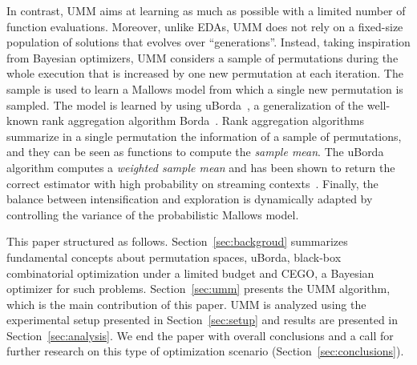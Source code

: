 \documentclass[runningheads]{llncs}
\begin{document}
In contrast, UMM aims at learning as much as possible with a limited number of
function evaluations. Moreover, unlike EDAs, UMM does not rely on a fixed-size
population of solutions that evolves over ``generations''. Instead, taking
inspiration from Bayesian optimizers, UMM considers a sample of permutations
during the whole execution that is increased by one new permutation at each
iteration. The sample is used to learn a Mallows model from which a single new
permutation is sampled. The model is learned by using
uBorda~\cite{IruLobPer2020arxiv}, a generalization of the well-known rank
aggregation algorithm Borda~\cite{AliMei2011kemeny}. Rank aggregation algorithms
summarize in a single permutation the information of a sample of permutations,
and they can be seen as functions to compute the \emph{sample mean}. The uBorda
algorithm computes a \textit{weighted sample mean} and has been shown to return
the correct estimator with high probability on streaming
contexts~\cite{IruLobPer2020arxiv}.
%
Finally, the balance between intensification and exploration is dynamically
adapted by controlling the variance of the probabilistic Mallows model.



This paper structured as follows. Section~\ref{sec:backgroud} summarizes fundamental concepts about permutation spaces, uBorda, black-box combinatorial optimization under a limited budget and CEGO, a Bayesian optimizer for such problems. Section~\ref{sec:umm} presents the UMM algorithm, which is the main contribution of this paper. UMM is analyzed using the experimental setup presented in Section~\ref{sec:setup} and results are presented in Section~\ref{sec:analysis}. We end the paper with overall conclusions and a call for further research on this type of optimization scenario (Section~\ref{sec:conclusions}).
\end{document}
